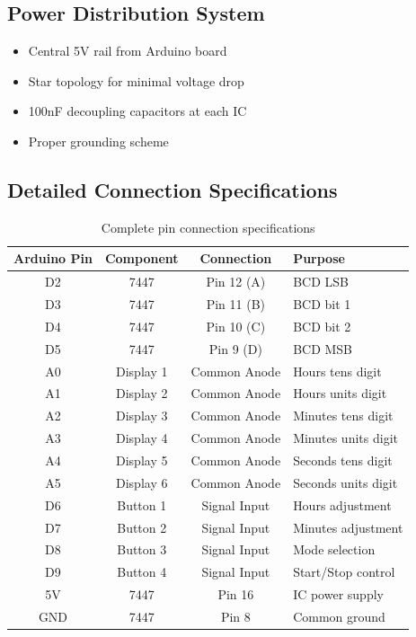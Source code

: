 \documentclass[a4paper,12pt]{article}
\begin{document}
\subsection{Power Distribution System}
\begin{itemize}
    \item Central 5V rail from Arduino board
    \item Star topology for minimal voltage drop
    \item 100nF decoupling capacitors at each IC
    \item Proper grounding scheme
\end{itemize}

\subsection{Detailed Connection Specifications}

\begin{table}[h]
    \centering
    \begin{tabular}{|c|c|c|l|}
    \hline
    \textbf{Arduino Pin} & \textbf{Component} & \textbf{Connection} & \textbf{Purpose} \\ \hline
    D2 & 7447 & Pin 12 (A) & BCD LSB \\ \hline
    D3 & 7447 & Pin 11 (B) & BCD bit 1 \\ \hline
    D4 & 7447 & Pin 10 (C) & BCD bit 2 \\ \hline
    D5 & 7447 & Pin 9 (D) & BCD MSB \\ \hline
    A0 & Display 1 & Common Anode & Hours tens digit \\ \hline
    A1 & Display 2 & Common Anode & Hours units digit \\ \hline
    A2 & Display 3 & Common Anode & Minutes tens digit \\ \hline
    A3 & Display 4 & Common Anode & Minutes units digit \\ \hline
    A4 & Display 5 & Common Anode & Seconds tens digit \\ \hline
    A5 & Display 6 & Common Anode & Seconds units digit \\ \hline
    D6 & Button 1 & Signal Input & Hours adjustment \\ \hline
    D7 & Button 2 & Signal Input & Minutes adjustment \\ \hline
    D8 & Button 3 & Signal Input & Mode selection \\ \hline
    D9 & Button 4 & Signal Input & Start/Stop control \\ \hline
    5V & 7447 & Pin 16 & IC power supply \\ \hline
    GND & 7447 & Pin 8 & Common ground \\ \hline
    \end{tabular}
    \caption{Complete pin connection specifications}
\end{table}
\end{document}

